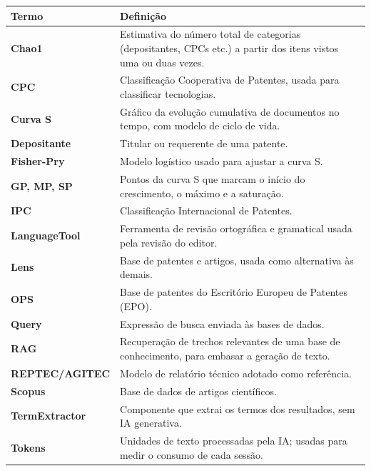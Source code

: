 \documentclass[
  brazilian,
  a4paper,12pt,oneside]{report}
\newcounter{none} %
\begin{document}
{\def\LTcaptype{none} %
\begin{longtable}[]{@{}
  >{\raggedright\arraybackslash}p{}
  >{\raggedright\arraybackslash}p{}@{}}
\toprule\noalign{}
\begin{minipage}[b]{\linewidth}\raggedright
Termo
\end{minipage} & \begin{minipage}[b]{\linewidth}\raggedright
Definição
\end{minipage} \\
\midrule\noalign{}
\endhead
\bottomrule\noalign{}
\endlastfoot
\textbf{Chao1} & Estimativa do número total de categorias (depositantes,
CPCs etc.) a partir dos itens vistos uma ou duas vezes. \\
\textbf{CPC} & Classificação Cooperativa de Patentes, usada para
classificar tecnologias. \\
\textbf{Curva S} & Gráfico da evolução cumulativa de documentos no
tempo, com modelo de ciclo de vida. \\
\textbf{Depositante} & Titular ou requerente de uma patente. \\
\textbf{Fisher-Pry} & Modelo logístico usado para ajustar a curva S. \\
\textbf{GP, MP, SP} & Pontos da curva S que marcam o início do
crescimento, o máximo e a saturação. \\
\textbf{IPC} & Classificação Internacional de Patentes. \\
\textbf{LanguageTool} & Ferramenta de revisão ortográfica e gramatical
usada pela revisão do editor. \\
\textbf{Lens} & Base de patentes e artigos, usada como alternativa às
demais. \\
\textbf{OPS} & Base de patentes do Escritório Europeu de Patentes
(EPO). \\
\textbf{Query} & Expressão de busca enviada às bases de dados. \\
\textbf{RAG} & Recuperação de trechos relevantes de uma base de
conhecimento, para embasar a geração de texto. \\
\textbf{REPTEC/AGITEC} & Modelo de relatório técnico adotado como
referência. \\
\textbf{Scopus} & Base de dados de artigos científicos. \\
\textbf{TermExtractor} & Componente que extrai os termos dos resultados,
sem IA generativa. \\
\textbf{Tokens} & Unidades de texto processadas pela IA; usadas para
medir o consumo de cada sessão. \\
\end{longtable}
}
\end{document}
